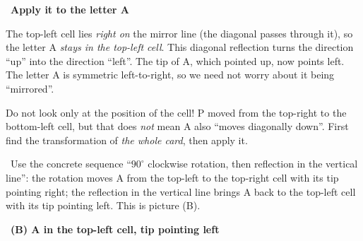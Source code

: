 \documentclass[11pt]{article}
\providecommand{\AnsWord}{Đáp số}
\newcommand{\ans}[1]{\par\smallskip{\bfseries\color{tmGreen!88!black}\AnsWord:}\ {\bfseries\color{AnsRed}#1}\par}
\newcommand{\step}[2]{\par\smallskip\noindent{\bfseries\color{tmBlue!85!black}\StepWord~#1.}\ {\bfseries #2}\par\nopagebreak}
\newcommand{\verify}[1]{\par\smallskip\noindent{\bfseries\color{tmGreen!80!black}\faCheckCircle\ \CheckWord}\ #1\par}
\def\AnsWord{Answer}
\def\StepWord{Step}
\def\CheckWord{Check:}
\begin{document}
{\step{3}{Apply it to the letter A}
The top-left cell lies \emph{right on} the mirror line (the diagonal passes through it), so the letter A
\emph{stays in the top-left cell}. This diagonal reflection turns the direction ``up'' into the direction
``left''. The tip of A, which pointed up, now points left. The letter A is symmetric left-to-right, so we need
not worry about it being ``mirrored''.

\begin{warnbox}Do not look only at the position of the cell! P moved from the top-right to the bottom-left
cell, but that does \emph{not} mean A also ``moves diagonally down''. First find the transformation of
\emph{the whole card}, then apply it.\end{warnbox}

\verify{Use the concrete sequence ``$90^\circ$ clockwise rotation, then reflection in the vertical line'': the
rotation moves A from the top-left to the top-right cell with its tip pointing right; the reflection in the
vertical line brings A back to the top-left cell with its tip pointing left. This is picture (B).}
\ans{(B) A in the top-left cell, tip pointing left}
}
\end{document}
